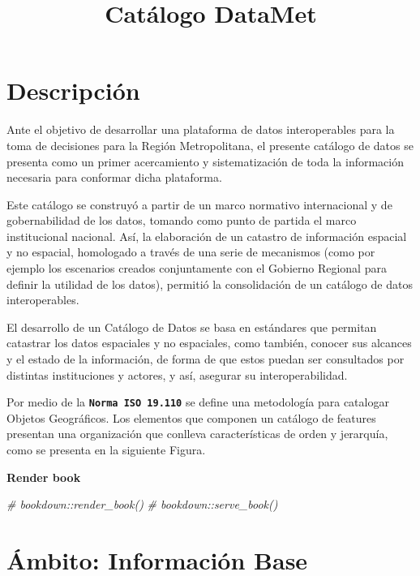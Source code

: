 \documentclass[
]{book}
\title{Catálogo DataMet}
\author{}
\date{\vspace{-2.5em}}
\makeatletter
\newenvironment{Shaded}{\begin{snugshade}}{\end{snugshade}}
\newcommand{\CommentTok}[1]{\textcolor[rgb]{0.56,0.35,0.01}{\textit{#1}}}
\newenvironment{kframe}{%
\medskip{}
\setlength{\fboxsep}{.8em}
 \def\at@end@of@kframe{}%
 \ifinner\ifhmode%
  \def\at@end@of@kframe{\end{minipage}}%
  \begin{minipage}{\columnwidth}%
 \fi\fi%
 \def\FrameCommand##1{\hskip\@totalleftmargin \hskip-\fboxsep
 \colorbox{shadecolor}{##1}\hskip-\fboxsep
     \hskip-\linewidth \hskip-\@totalleftmargin \hskip\columnwidth}%
 \MakeFramed {\advance\hsize-\width
   \@totalleftmargin\z@ \linewidth\hsize
   \@setminipage}}%
 {\par\unskip\endMakeFramed%
 \at@end@of@kframe}
\renewenvironment{Shaded}{\begin{kframe}}{\end{kframe}}
\theoremstyle{definition}
\theoremstyle{definition}
\theoremstyle{definition}
\theoremstyle{definition}
\theoremstyle{remark}
\makeatother
\begin{document}
\maketitle

{
\setcounter{tocdepth}{1}
\tableofcontents
}
\hypertarget{descripciuxf3n}{%
\chapter*{Descripción}\label{descripciuxf3n}}

Ante el objetivo de desarrollar una plataforma de datos interoperables para la toma de decisiones para la Región Metropolitana, el presente catálogo de datos se presenta como un primer acercamiento y sistematización de toda la información necesaria para conformar dicha plataforma.

Este catálogo se construyó a partir de un marco normativo internacional y de gobernabilidad de los datos, tomando como punto de partida el marco institucional nacional. Así, la elaboración de un catastro de información espacial y no espacial, homologado a través de una serie de mecanismos (como por ejemplo los escenarios creados conjuntamente con el Gobierno Regional para definir la utilidad de los datos), permitió la consolidación de un catálogo de datos interoperables.

El desarrollo de un Catálogo de Datos se basa en estándares que permitan catastrar los datos espaciales y no espaciales, como también, conocer sus alcances y el estado de la información, de forma de que estos puedan ser consultados por distintas instituciones y actores, y así, asegurar su interoperabilidad.

Por medio de la \textbf{\texttt{Norma\ ISO\ 19.110}} se define una metodología para catalogar Objetos Geográficos. Los elementos que componen un catálogo de features presentan una organización que conlleva características de orden y jerarquía, como se presenta en la siguiente Figura.

\textbf{Render book}

\begin{Shaded}
\begin{Highlighting}[]
\CommentTok{\# bookdown::render\_book()}
\CommentTok{\# bookdown::serve\_book()}
\end{Highlighting}
\end{Shaded}

\hypertarget{uxe1mbito-informaciuxf3n-base}{%
\chapter{Ámbito: Información Base}\label{uxe1mbito-informaciuxf3n-base}}
\end{document}
